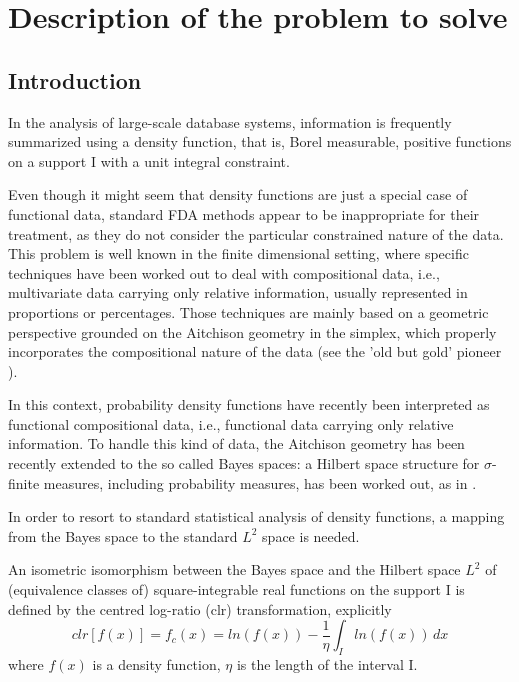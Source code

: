 \chapter{Description of the problem to solve}
\newtheorem*{definition}{Definition}
\label{problem}

\noindent 
\section{Introduction}
In the analysis of large-scale database systems, information is frequently summarized using a density function, that is, Borel measurable, positive functions on a support $\text{I}$ with a unit integral constraint. 

Even though it might seem that density functions are just a special case of functional data, standard FDA methods appear to be inappropriate for their treatment, as they do not consider the particular constrained nature of the data. 
This problem is well known in the finite dimensional setting, where specific techniques have been worked out to deal with compositional data, i.e., multivariate data carrying only relative information, usually represented in proportions or percentages. 
Those techniques are mainly based on a geometric perspective grounded on the Aitchison geometry in the simplex, which properly incorporates the compositional nature of the data (see the 'old but gold' pioneer \citep{aitchinson:bayes}). 

In this context, probability density functions have recently been interpreted as functional compositional data, i.e., functional data carrying only relative information.
To handle this kind of data, the Aitchison geometry has been recently extended to the so called Bayes spaces: a Hilbert space structure for $\sigma$-finite measures, including probability measures, has been worked out, as in \citep{vdboogaart:bayes}.

In order to resort to standard statistical analysis of density functions, a mapping from the Bayes space to the standard $\textit{L}^2$ space is needed. 

An isometric isomorphism between the Bayes space and the Hilbert space $\textit{L}^2$ of (equivalence classes of) square-integrable real functions on the support $\text{I}$ is defined by the centred log-ratio (clr) transformation, explicitly 
\[	clr[f(x)] = f_c(x) = ln(f(x)) - \frac{1}{\eta}\int_{I} ln(f(x))\, dx 	\]
where $f(x)$ is a density function, $\eta$ is the length of the interval I.

